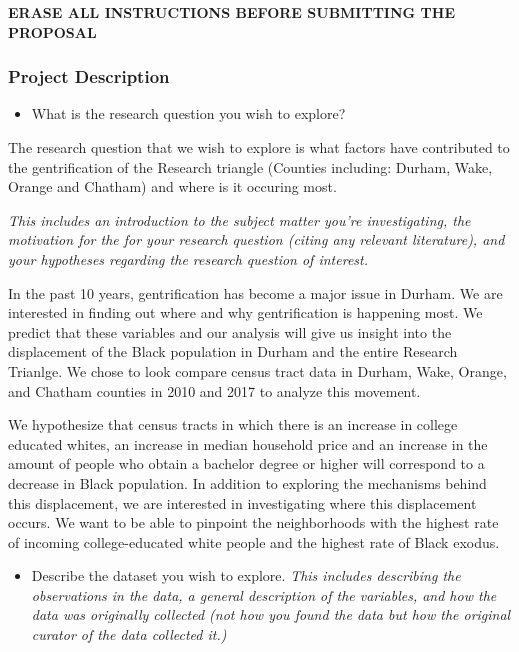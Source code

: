 \documentclass[]{article}
\providecommand{\tightlist}{%
  \setlength{\itemsep}{0pt}\setlength{\parskip}{0pt}}
\begin{document}
\textbf{ERASE ALL INSTRUCTIONS BEFORE SUBMITTING THE PROPOSAL}

\hypertarget{project-description}{%
\subsubsection{Project Description}\label{project-description}}

\begin{itemize}
\tightlist
\item
  What is the research question you wish to explore?
\end{itemize}

The research question that we wish to explore is what factors have
contributed to the gentrification of the Research triangle (Counties
including: Durham, Wake, Orange and Chatham) and where is it occuring
most.

\emph{This includes an introduction to the subject matter you're
investigating, the motivation for the for your research question (citing
any relevant literature), and your hypotheses regarding the research
question of interest.}

In the past 10 years, gentrification has become a major issue in Durham.
We are interested in finding out where and why gentrification is
happening most. We predict that these variables and our analysis will
give us insight into the displacement of the Black population in Durham
and the entire Research Trianlge. We chose to look compare census tract
data in Durham, Wake, Orange, and Chatham counties in 2010 and 2017 to
analyze this movement.

We hypothesize that census tracts in which there is an increase in
college educated whites, an increase in median household price and an
increase in the amount of people who obtain a bachelor degree or higher
will correspond to a decrease in Black population. In addition to
exploring the mechanisms behind this displacement, we are interested in
investigating where this displacement occurs. We want to be able to
pinpoint the neighborhoods with the highest rate of incoming
college-educated white people and the highest rate of Black exodus.

\begin{itemize}
\tightlist
\item
  Describe the dataset you wish to explore. \emph{This includes
  describing the observations in the data, a general description of the
  variables, and how the data was originally collected (not how you
  found the data but how the original curator of the data collected
  it.)}
\end{itemize}
\end{document}
